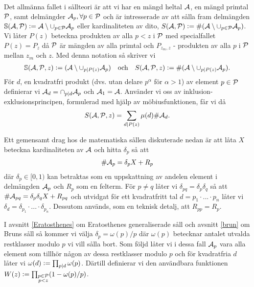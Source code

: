 Det allmänna fallet i sållteori är att vi har en mängd heltal \(\A\), en mängd primtal \(\P\), samt delmängder \(\A_p, \forall p \in \P\) och är intresserade av att sålla fram delmängden \(\mathbb{S}(\A, \P) := \A \setminus \cup_{p \in \P} \A_p\) eller kardinaliteten av dito, \(S(\A, \P) :=\card{(\A \setminus \cup_{p \in \P} \A_p)}\). Vi låter \(P(z)\) beteckna produkten av alla \(p < z\) i \(\P\) med specialfallet \(P(z) = P_z\) då \(\P\) är mängden av alla primtal och \(P_{z_m, z}\) - produkten av alla \(p\) i \(\P\) mellan \(z_m\) och \(z\). Med denna notation så skriver vi %
\begin{align*}
    \mathbb{S}(\A, \P, z) := (\A \setminus \cup_{p \divides P(z)} \A_p)
    \quad \text{och} \quad
    \S{A}{P}{z} := \card{(\A \setminus \cup_{p \divides P(z)} \A_p)} .
\end{align*}
För \(d\), en kvadratfri produkt (dvs. utan delare \(p^\alpha\) för \(\alpha > 1\)) av element \(p \in \P\) definierar vi \(\A_d = \cap_{p \divides d} \A_p\) och \(\A_1 = \A\). Använder vi oss av inklusion-exklusionsprincipen, formulerad med hjälp av möbiusfunktionen, får vi då
\begin{align} \label{inclusionexclusion}
    \S{A}{P}{z} = \sum_{d \divides P(z)} \mu(d) \card{\A_d} .
\end{align} %

Ett gemensamt drag hos de matematiska sållen diskuterade nedan är att låta \(X\) beteckna kardinaliteten av \(\A\) och hitta \(\delta_p\) så att
\begin{align} \label{deltaX}
    \card{\A_p} = \delta_p X + R_p
\end{align}
där \(\delta_p \in [0, 1)\) kan betraktas som en uppskattning av andelen element i delmängden \(\A_p\) och \(R_p\) som en felterm. För \(p \neq q\) låter vi \(\delta_{pq} = \delta_p \delta_q\) så att \(\card{\A_{pq}} = \delta_p \delta_q X + R_{pq}\) och utvidgat för ett kvadratfritt tal \(d = p_1 \cdot ... \cdot p_n\) låter vi \(\delta_{d} = \delta_{p_1} \cdot ... \cdot \delta_{p_n}\). Dessutom används, som en teknisk detalj, att \(R_{pp} = R_p\). 

I avsnitt \ref{Eratosthenes} om Eratosthenes generaliserade såll och avsnitt \ref{brun} om Bruns såll så kommer vi välja \(\delta_p = \omega(p) / p\) där \(\omega(p)\) betecknar antalet utvalda restklasser modulo \(p\) vi vill sålla bort. Som följd låter vi i dessa fall \(\A_p\) vara alla element som tillhör någon av dessa restklasser modulo $p$ och för kvadratfria $d$ låter vi \(\omega(d) := \prod_{p \divides d} \omega(p)\). Därtill definierar vi den användbara funktionen \(W(z) := \prod_{\substack{p \in \P \\ p < z}}(1 - \omega(p) / p)\).



